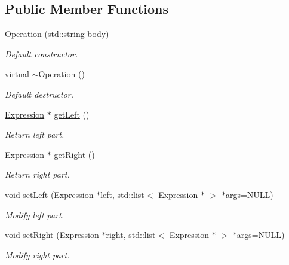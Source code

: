 \subsection*{Public Member Functions}
\begin{DoxyCompactItemize}
\item 
\hyperlink{class_operation_a0e3093e2e6de79589f35512d40d3466a}{Operation} (std\-::string body)
\begin{DoxyCompactList}\small\item\em Default constructor. \end{DoxyCompactList}\item 
virtual \hyperlink{class_operation_a14089623bd8a73e73375353c3d8a4b6e}{$\sim$\-Operation} ()
\begin{DoxyCompactList}\small\item\em Default destructor. \end{DoxyCompactList}\item 
\hyperlink{class_expression}{Expression} $\ast$ \hyperlink{class_operation_ace96896e4c65551fa09a2536215b6150}{get\-Left} ()
\begin{DoxyCompactList}\small\item\em Return left part. \end{DoxyCompactList}\item 
\hyperlink{class_expression}{Expression} $\ast$ \hyperlink{class_operation_a5a02d5d55ce671d8dc000a23e030214e}{get\-Right} ()
\begin{DoxyCompactList}\small\item\em Return right part. \end{DoxyCompactList}\item 
void \hyperlink{class_operation_a5ea445954bac8500ce72cc0d3f4e8bb7}{set\-Left} (\hyperlink{class_expression}{Expression} $\ast$left, std\-::list$<$ \hyperlink{class_expression}{Expression} $\ast$ $>$ $\ast$args=N\-U\-L\-L)
\begin{DoxyCompactList}\small\item\em Modify left part. \end{DoxyCompactList}\item 
void \hyperlink{class_operation_aeb66325b8e09adceaebbf7e906e6748c}{set\-Right} (\hyperlink{class_expression}{Expression} $\ast$right, std\-::list$<$ \hyperlink{class_expression}{Expression} $\ast$ $>$ $\ast$args=N\-U\-L\-L)
\begin{DoxyCompactList}\small\item\em Modify right part. \end{DoxyCompactList}\end{DoxyCompactItemize}
